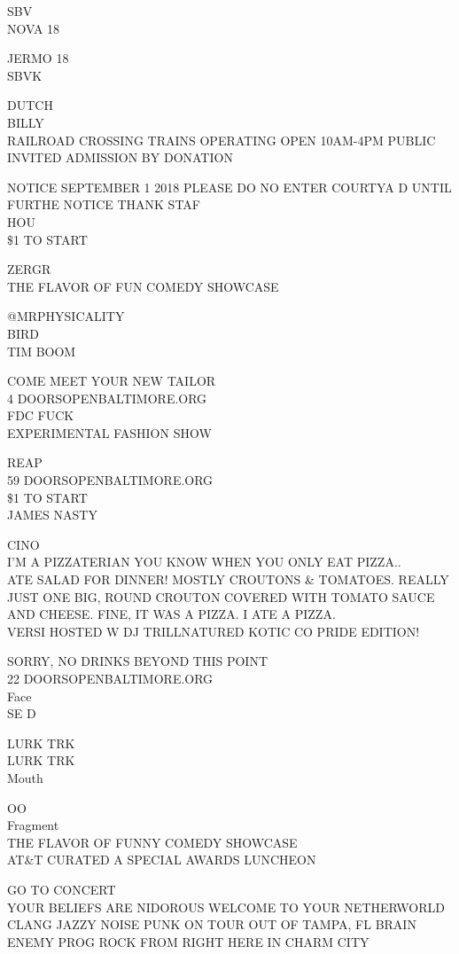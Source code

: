 \documentclass[10pt,letterpaper]{article}
\begin{document}
SBV\\
NOVA 18

JERMO 18\\
SBVK

DUTCH\\
BILLY\\
RAILROAD CROSSING TRAINS OPERATING OPEN 10AM{-}4PM PUBLIC INVITED ADMISSION BY DONATION

NOTICE SEPTEMBER 1 2018 PLEASE DO NO ENTER COURTYA D UNTIL FURTHE NOTICE THANK STAF\\
HOU\\
\$1 TO START

ZERGR\\
THE FLAVOR OF FUN COMEDY SHOWCASE

@MRPHYSICALITY\\
BIRD\\
TIM BOOM

COME MEET YOUR NEW TAILOR\\
4 DOORSOPENBALTIMORE.ORG\\
FDC FUCK\\
EXPERIMENTAL FASHION SHOW

REAP\\
59 DOORSOPENBALTIMORE.ORG\\
\$1 TO START\\
JAMES NASTY

CINO\\
I'M A PIZZATERIAN YOU KNOW WHEN YOU ONLY EAT PIZZA..\\
ATE SALAD FOR DINNER!  MOSTLY CROUTONS \& TOMATOES.  REALLY JUST ONE BIG, ROUND CROUTON COVERED WITH TOMATO SAUCE AND CHEESE.  FINE, IT WAS A PIZZA.  I ATE A PIZZA.\\
VERSI HOSTED W DJ TRILLNATURED KOTIC CO PRIDE EDITION!

SORRY, NO DRINKS BEYOND THIS POINT\\
22 DOORSOPENBALTIMORE.ORG\\
Face\\
SE D

LURK TRK\\
LURK TRK\\
Mouth

OO\\
Fragment\\
THE FLAVOR OF FUNNY COMEDY SHOWCASE\\
AT\&T CURATED A SPECIAL AWARDS LUNCHEON

GO TO CONCERT\\
YOUR BELIEFS ARE NIDOROUS WELCOME TO YOUR NETHERWORLD\\
CLANG JAZZY NOISE PUNK ON TOUR OUT OF TAMPA, FL BRAIN ENEMY PROG ROCK FROM RIGHT HERE IN CHARM CITY
\end{document}
